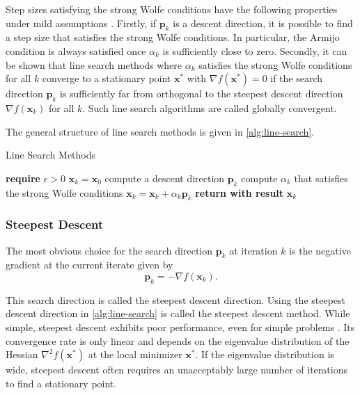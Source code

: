 Step sizes satisfying the strong Wolfe conditions have the following properties under mild assumptions \cite{nocedal2006}. Firstly, 
if $\bm{p}_k$ is a descent direction, it is possible to find a step size that satisfies the strong Wolfe conditions. In particular,
the Armijo condition is always satisfied once $\alpha_k$ is sufficiently close to zero. Secondly, it 
can be shown that line search methods where $\alpha_k$ satisfies the strong Wolfe conditions for all $k$ converge to a stationary
point $\bm{x}^*$ with $\nabla f(\bm{x}^*) = 0$ if the search direction $\bm{p}_k$ is sufficiently far from orthogonal to the steepest
descent direction $\nabla f(\bm{x}_k)$ for all $k$. Such line search algorithms are called globally convergent.

The general structure of line search methods is given in \cref{alg:line-search}.

\begin{algorithm}
\caption{Line Search Methods}\label{alg:line-search}
\begin{algorithmic}
\State \textbf{require } $\epsilon > 0$
\State $\bm{x}_k = \bm{x}_0$
\State compute a descent direction $\bm{p}_k$
\State compute $\alpha_k$ that satisfies the strong Wolfe conditions
\State $\bm{x}_k = \bm{x}_k + \alpha_k \bm{p}_k$
\EndWhile
\State \textbf{return with result } $\bm{x}_k$
\EndProcedure
\end{algorithmic}
\end{algorithm}

\subsubsection{Steepest Descent}\label{sss:steepest-descent}
The most obvious choice for the search direction $\bm{p}_k$ at iteration $k$ is the negative gradient at the current iterate given by 
\[
    \bm{p}_k = -\nabla f(\bm{x}_k).
\]

\noindent This search direction is called the steepest descent direction. Using the steepest descent direction in \cref{alg:line-search} 
is called the steepest descent method. While simple, steepest descent exhibits poor performance, even for simple problems \cite{nocedal2006}. 
Its convergence rate is only linear and depends on the eigenvalue distribution of the Hessian $\nabla^2 f(\bm{x}^*)$ at the local minimizer
$\bm{x}^*$. If the eigenvalue distribution is wide, steepest descent often requires an unacceptably large number of iterations to find a 
stationary point.

